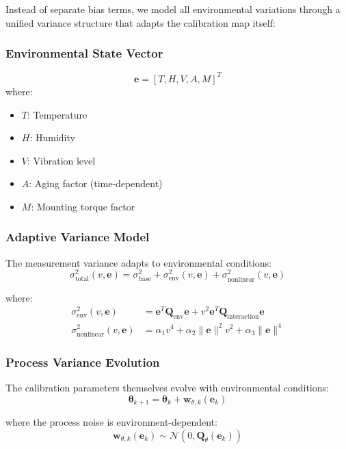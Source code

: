 \documentclass[11pt]{article}
\begin{document}
Instead of separate bias terms, we model all environmental variations through a unified variance structure that adapts the calibration map itself:

\subsubsection{Environmental State Vector}
\begin{equation}
\mathbf{e} = [T, H, V, A, M]^T
\end{equation}
where:
\begin{itemize}
\item $T$: Temperature
\item $H$: Humidity  
\item $V$: Vibration level
\item $A$: Aging factor (time-dependent)
\item $M$: Mounting torque factor
\end{itemize}

\subsubsection{Adaptive Variance Model}
The measurement variance adapts to environmental conditions:
\begin{equation}
\sigma_{\text{total}}^2(v, \mathbf{e}) = \sigma_{\text{base}}^2 + \sigma_{\text{env}}^2(v, \mathbf{e}) + \sigma_{\text{nonlinear}}^2(v, \mathbf{e})
\end{equation}

where:
\begin{align}
\sigma_{\text{env}}^2(v, \mathbf{e}) &= \mathbf{e}^T \mathbf{Q}_{\text{env}} \mathbf{e} + v^2 \mathbf{e}^T \mathbf{Q}_{\text{interaction}} \mathbf{e} \\
\sigma_{\text{nonlinear}}^2(v, \mathbf{e}) &= \alpha_1 v^4 + \alpha_2 \|\mathbf{e}\|^2 v^2 + \alpha_3 \|\mathbf{e}\|^4
\end{align}

\subsubsection{Process Variance Evolution}
The calibration parameters themselves evolve with environmental conditions:
\begin{equation}
\bm{\theta}_{k+1} = \bm{\theta}_k + \mathbf{w}_{\theta,k}(\mathbf{e}_k)
\end{equation}

where the process noise is environment-dependent:
\begin{equation}
\mathbf{w}_{\theta,k}(\mathbf{e}_k) \sim \mathcal{N}(0, \mathbf{Q}_{\theta}(\mathbf{e}_k))
\end{equation}
\end{document}
